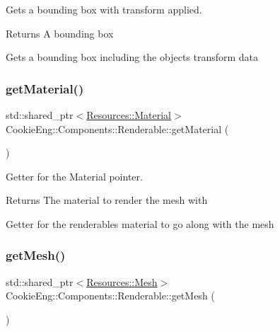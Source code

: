Gets a bounding box with transform applied. 

\begin{DoxyReturn}{Returns}
A bounding box
\end{DoxyReturn}
Gets a bounding box including the objects transform data \mbox{\label{class_cookie_eng_1_1_components_1_1_renderable_a578ffbbc5b4245ade613d0dcfa571413}} 
\subsubsection{\texorpdfstring{get\+Material()}{getMaterial()}}
{\footnotesize\ttfamily std\+::shared\+\_\+ptr$<$\hyperlink{class_cookie_eng_1_1_resources_1_1_material}{Resources\+::\+Material}$>$ Cookie\+Eng\+::\+Components\+::\+Renderable\+::get\+Material (\begin{DoxyParamCaption}{ }\end{DoxyParamCaption})\hspace{0.3cm}{\ttfamily [inline]}}



Getter for the Material pointer. 

\begin{DoxyReturn}{Returns}
The material to render the mesh with
\end{DoxyReturn}
Getter for the renderables material to go along with the mesh \mbox{\label{class_cookie_eng_1_1_components_1_1_renderable_a37002e38b2ea9a39c31dc5d610ce827b}} 
\subsubsection{\texorpdfstring{get\+Mesh()}{getMesh()}}
{\footnotesize\ttfamily std\+::shared\+\_\+ptr$<$\hyperlink{struct_cookie_eng_1_1_resources_1_1_mesh}{Resources\+::\+Mesh}$>$ Cookie\+Eng\+::\+Components\+::\+Renderable\+::get\+Mesh (\begin{DoxyParamCaption}{ }\end{DoxyParamCaption})\hspace{0.3cm}{\ttfamily [inline]}}



